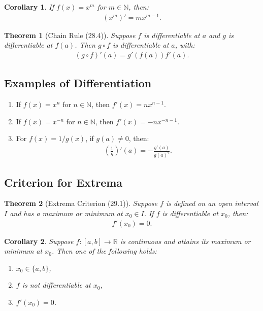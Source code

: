 \documentclass[9pt]{article}
\theoremstyle{definition}
\theoremstyle{plain}
\newtheorem{theorem}{Theorem}
\newtheorem{corollary}{Corollary}
\begin{document}
\begin{corollary}
If $ f(x) = x^m $ for $ m \in \mathbb{N} $, then:
\begin{align}
(x^m)' = mx^{m-1}.
\end{align}
\end{corollary}

\begin{theorem}[Chain Rule (28.4)]
Suppose $ f $ is differentiable at $ a $ and $ g $ is differentiable at $ f(a) $. Then $ g \circ f $ is differentiable at $ a $, with:
\begin{align}
(g \circ f)'(a) = g'(f(a))f'(a).
\end{align}
\end{theorem}

\subsection*{Examples of Differentiation}
\begin{enumerate}
    \item If $ f(x) = x^n $ for $ n \in \mathbb{N} $, then $ f'(x) = nx^{n-1} $.
    \item If $ f(x) = x^{-n} $ for $ n \in \mathbb{N} $, then $ f'(x) = -nx^{-n-1} $.
    \item For $ f(x) = 1/g(x) $, if $ g(a) \neq 0 $, then:
    \begin{align}
    \left( \frac{1}{g} \right)'(a) = -\frac{g'(a)}{g(a)^2}.
    \end{align}
\end{enumerate}

\subsection*{Criterion for Extrema}
\begin{theorem}[Extrema Criterion (29.1)]
Suppose $ f $ is defined on an open interval $ I $ and has a maximum or minimum at $ x_0 \in I $. If $ f $ is differentiable at $ x_0 $, then:
\begin{align}
f'(x_0) = 0.
\end{align}
\end{theorem}

\begin{corollary}
Suppose $ f : [a, b] \to \mathbb{R} $ is continuous and attains its maximum or minimum at $ x_0 $. Then one of the following holds:
\begin{enumerate}
    \item $ x_0 \in \{a, b\} $,
    \item $ f $ is not differentiable at $ x_0 $,
    \item $ f'(x_0) = 0 $.
\end{enumerate}
\end{corollary}
\end{document}
